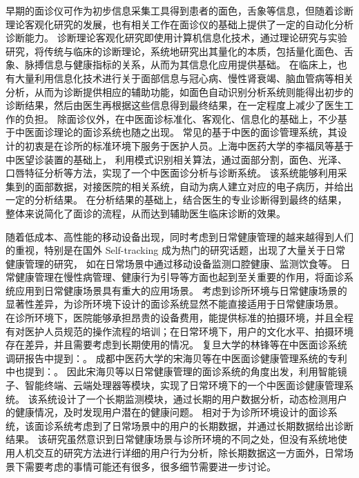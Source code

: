 早期的面诊仪可作为初步信息采集工具得到患者的面色，舌象等信息，但随着诊断理论客观化研究的发展，也有相关工作在面诊仪的基础上提供了一定的自动化分析诊断能力。
诊断理论客观化研究即使用计算机信息化技术，通过理论研究与实验研究，将传统与临床的诊断理论，系统地研究出其量化的本质，包括量化面色、舌象、脉搏信息与健康指标的关系\cite{Wang2013TCM, guo2015analysis, li2020tcminet}，从而为其信息化应用提供基础。
在临床上，也有大量利用信息化技术进行关于面部信息与冠心病、慢性肾衰竭、脑血管病等相关分析，从而为诊断提供相应的辅助功能，如面色自动识别分析系统\cite{崔骥2018人工智能背景下中医诊疗技术的应用与展望}则能得出初步的诊断结果，然后由医生再根据这些信息得到最终结果，在一定程度上减少了医生工作的负担。
除面诊仪外，在中医面诊标准化、客观化、信息化的基础上，不少基于中医面诊理论的面诊系统也随之出现。
常见的基于中医的面诊管理系统，其设计的初衷是在诊所的标准环境下服务于医护人员。上海中医药大学的李福凤等基于中医望诊装置\cite{李国正0一种用于中医望诊的三维图像采集装置}的基础上，
利用模式识别相关算法，通过面部分割，面色、光泽、口唇特征分析等方法，实现了一个中医面诊分析与诊断系统\cite{李福凤2016中医面诊分析与诊断系统}。
该系统能够利用采集到的面部数据，对接医院的相关系统，自动为病人建立对应的电子病历，并给出一定的分析结果。
在分析结果的基础上，结合医生的专业诊断得到最终的结果，整体来说简化了面诊的流程，从而达到辅助医生临床诊断的效果。

随着低成本、高性能的移动设备出现，同时考虑到日常健康管理的越来越得到人们的重视，特别是在国外 Self-tracking \cite{sanches2019hci} 成为热门的研究话题，出现了大量关于日常健康管理的研究，
如在日常场景中通过移动设备监测口腔健康\cite{liang2020oralcam}、监测饮食\cite{burgermaster2019personal}等。
日常健康管理在慢性病管理、健康行为引导等方面也起到至关重要的作用，将面诊系统应用到日常健康场景具有重大的应用场景。
考虑到诊所环境与日常健康场景的显著性差异，为诊所环境下设计的面诊系统显然不能直接适用于日常健康场景。
在诊所环境下，医院能够承担昂贵的设备费用，能提供标准的拍摄环境，并且全程有对医护人员规范的操作流程的培训；在日常环境下，用户的文化水平、拍摄环境存在差异，并且需要考虑到长期使用的情况。
复旦大学的林锋等在中医面诊系统调研报告\cite{林锋2019中医面诊系统调研报告}中提到：。
成都中医药大学的宋海贝等在中医面诊健康管理系统的专利\cite{宋海贝2019中医面诊健康管理系统}中也提到：。
因此宋海贝等以日常健康管理的面诊系统的角度出发，利用智能镜子、智能终端、云端处理器等模块，实现了日常环境下的一个中医面诊健康管理系统。
该系统设计了一个长期监测模块，通过长期的用户数据分析，动态检测用户的健康情况，及时发现用户潜在的健康问题。
相对于为诊所环境设计的面诊系统，该面诊系统考虑到了日常场景中的用户的长期数据，并通过长期数据给出诊断结果。
该研究虽然意识到日常健康场景与诊所环境的不同之处，但没有系统地使用人机交互的研究方法进行详细的用户行为分析，除长期数据这一方面外，日常场景下需要考虑的事情可能还有很多，很多细节需要进一步讨论。

